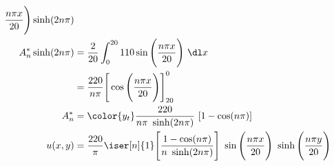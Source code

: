 \begin{enumerate}
\begin{align}
              \frac{n\pi x}{20} \Bigg)
              \sinh(2n\pi)                                                      \\
              A_n^* \sinh(2n\pi) & = \frac{2}{20} \int_{0}^{20} 110 \sin\Bigg(
              \frac{n\pi x}{20}\Bigg)\ \dl x                                    \\
                                 & = \frac{220}{n\pi} \Bigg[ \cos\Bigg(
              \frac{n\pi x}{20} \Bigg) \Bigg]_{20}^{0}                          \\
              A_n^*              & = \color{y_t} \frac{220}{n\pi\ \sinh(2n\pi)}
              \ [1 - \cos(n\pi)]                                                \\
              u(x, y)            & = \frac{220}{\pi} \iser[n]{1} \Bigg[\frac{1
                      - \cos(n\pi)}{n\ \sinh(2n\pi)}\Bigg]\ \sin\Bigg( \frac{n\pi x}
              {20}\Bigg)\ \sinh\Bigg( \frac{n\pi y}{20} \Bigg)
          \end{align}


\end{enumerate}
